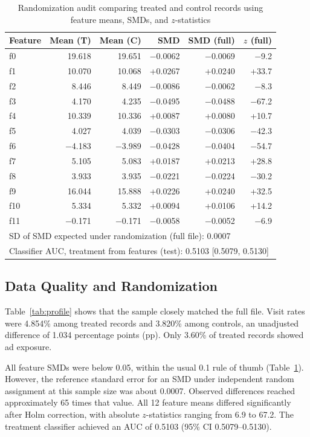 \documentclass[conference]{IEEEtran}
\begin{document}
\begin{table}[t]
  \centering
  \caption{Randomization audit comparing treated and control records
           using feature means, SMDs, and \(z\)-statistics}
  \label{tab:rand}
  \setlength{\tabcolsep}{4pt}
  \footnotesize
  \begin{tabular}{lrrrrr}
\toprule
Feature & Mean (T) & Mean (C) & SMD & SMD (full) & $z$ (full) \\
\midrule
f0 & 19.618 & 19.651 & $-$0.0062 & $-$0.0069 & $-$9.2 \\
f1 & 10.070 & 10.068 & +0.0267 & +0.0240 & +33.7 \\
f2 & 8.446 & 8.449 & $-$0.0086 & $-$0.0062 & $-$8.3 \\
f3 & 4.170 & 4.235 & $-$0.0495 & $-$0.0488 & $-$67.2 \\
f4 & 10.339 & 10.336 & +0.0087 & +0.0080 & +10.7 \\
f5 & 4.027 & 4.039 & $-$0.0303 & $-$0.0306 & $-$42.3 \\
f6 & $-$4.183 & $-$3.989 & $-$0.0428 & $-$0.0404 & $-$54.7 \\
f7 & 5.105 & 5.083 & +0.0187 & +0.0213 & +28.8 \\
f8 & 3.933 & 3.935 & $-$0.0221 & $-$0.0224 & $-$30.2 \\
f9 & 16.044 & 15.888 & +0.0226 & +0.0240 & +32.5 \\
f10 & 5.334 & 5.332 & +0.0094 & +0.0106 & +14.2 \\
f11 & $-$0.171 & $-$0.171 & $-$0.0058 & $-$0.0052 & $-$6.9 \\
\midrule
\multicolumn{6}{l}{SD of SMD expected under randomization (full file): 0.0007} \\
\multicolumn{6}{l}{Classifier AUC, treatment from features (test): 0.5103 [0.5079, 0.5130]} \\
\bottomrule
\end{tabular}
\end{table}

\subsection{Data Quality and Randomization}

Table~\ref{tab:profile} shows that the sample closely matched the full
file. Visit rates were 4.854\% among treated records and 3.820\% among
controls, an unadjusted difference of 1.034 percentage points (pp).
Only 3.60\% of treated records showed ad exposure.

All feature SMDs were below 0.05, within the usual 0.1 rule of thumb
(Table~\ref{tab:rand}). However, the reference standard error for an
SMD under independent random assignment at this sample size was about
0.0007. Observed differences reached approximately 65 times that
value. All 12 feature means differed significantly after Holm correction,
with absolute \(z\)-statistics ranging from 6.9 to 67.2. The treatment
classifier achieved an AUC of 0.5103 (95\% CI 0.5079--0.5130).
\end{document}
